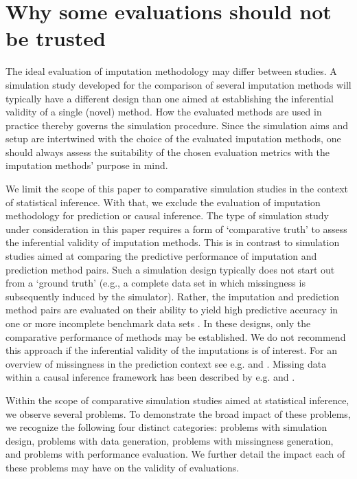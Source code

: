 \documentclass[bimj,fleqn]{w-art}
\begin{document}

\section{Why some evaluations should not be trusted}

The ideal evaluation of imputation methodology may differ between studies. A simulation study developed for the comparison of several imputation methods will typically have a different design than one aimed at establishing the inferential validity of a single (novel) method. How the evaluated methods are used in practice thereby governs the simulation procedure. Since the simulation aims and setup are intertwined with the choice of the evaluated imputation methods, one should always assess the suitability of the chosen evaluation metrics with the imputation methods' purpose in mind. 

We limit the scope of this paper to comparative simulation studies in the context of statistical inference. With that, we exclude the evaluation of imputation methodology for prediction or causal inference. The type of simulation study under consideration in this paper requires a form of `comparative truth' to assess the inferential validity of imputation methods. This is in contrast to simulation studies aimed at comparing the predictive performance of imputation and prediction method pairs. Such a simulation design typically does not start out from a `ground truth' (e.g., a complete data set in which missingness is subsequently induced by the simulator). Rather, the imputation and prediction method pairs are evaluated on their ability to yield high predictive accuracy in one or more incomplete benchmark data sets \citep{liu21}. In these designs, only the comparative performance of methods may be established. We do not recommend this approach if the inferential validity of the imputations is of interest. For an overview of missingness in the prediction context see e.g. \citet{wood15} and \citet{sper20}. Missing data within a causal inference framework has been described by e.g. \cite{more18} and \cite{moha21}.

Within the scope of comparative simulation studies aimed at statistical inference, we observe several problems. To demonstrate the broad impact of these problems, we recognize the following four distinct categories: problems with simulation design, problems with data generation, problems with missingness generation, and problems with performance evaluation. We further detail the impact each of these problems may have on the validity of evaluations. 
\end{document}
